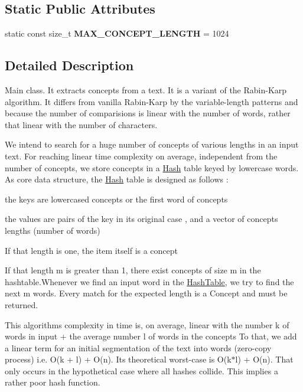 \subsection*{Static Public Attributes}
\begin{DoxyCompactItemize}
\item 
\mbox{\label{class_concept_1_1_concept_extractor_ab6c5459d1379b79c69b29023bb3f552e}} 
static const size\+\_\+t {\bfseries M\+A\+X\+\_\+\+C\+O\+N\+C\+E\+P\+T\+\_\+\+L\+E\+N\+G\+TH} = 1024
\end{DoxyCompactItemize}


\subsection{Detailed Description}
Main class. It extracts concepts from a text. It is a variant of the Rabin-\/\+Karp algorithm. It differs from vanilla Rabin-\/\+Karp by the variable-\/length patterns and because the number of comparisions is linear with the number of words, rather that linear with the number of characters.

We intend to search for a huge number of concepts of various lengths in an input text. For reaching linear time complexity on average, independent from the number of concepts, we store concepts in a \mbox{\hyperlink{class_concept_1_1_hash}{Hash}} table keyed by lowercase words. As core data structure, the \mbox{\hyperlink{class_concept_1_1_hash}{Hash}} table is designed as follows \+:
\begin{DoxyEnumerate}
\item the keys are lowercased concepts or the first word of concepts
\item the values are pairs of the key in its original case , and a vector of concepts lengths (number of words)
\begin{DoxyItemize}
\item If that length is one, the item itself is a concept
\item If that length m is greater than 1, there exist concepts of size m in the hashtable.Whenever we find an input word in the \mbox{\hyperlink{class_concept_1_1_hash_table}{Hash\+Table}}, we try to find the next m words. Every match for the expected length is a Concept and must be returned.
\end{DoxyItemize}
\end{DoxyEnumerate}

This algorithm\textquotesingle{}s complexity in time is, on average, linear with the number k of words in input + the average number l of words in the concepts To that, we add a linear term for an initial segmentation of the text into words (zero-\/copy process) i.\+e. O(k + l) + O(n). Its theoretical worst-\/case is O(k$\ast$l) + O(n). That only occurs in the hypothetical case where all hashes collide. This implies a rather poor hash function.

